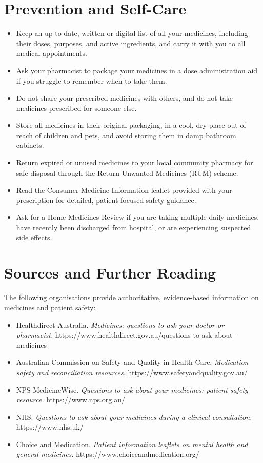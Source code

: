 \section*{Prevention and Self-Care}
\begin{itemize}
    \item Keep an up-to-date, written or digital list of all your medicines, including their doses, purposes, and active ingredients, and carry it with you to all medical appointments.
    \item Ask your pharmacist to package your medicines in a dose administration aid if you struggle to remember when to take them.
    \item Do not share your prescribed medicines with others, and do not take medicines prescribed for someone else.
    \item Store all medicines in their original packaging, in a cool, dry place out of reach of children and pets, and avoid storing them in damp bathroom cabinets.
    \item Return expired or unused medicines to your local community pharmacy for safe disposal through the Return Unwanted Medicines (RUM) scheme.
    \item Read the Consumer Medicine Information leaflet provided with your prescription for detailed, patient-focused safety guidance.
    \item Ask for a Home Medicines Review if you are taking multiple daily medicines, have recently been discharged from hospital, or are experiencing suspected side effects.
\end{itemize}

\section*{Sources and Further Reading}
The following organisations provide authoritative, evidence-based information on medicines and patient safety:
\begin{itemize}
    \item Healthdirect Australia. \textit{Medicines: questions to ask your doctor or pharmacist.} https://www.healthdirect.gov.au/questions-to-ask-about-medicines
    \item Australian Commission on Safety and Quality in Health Care. \textit{Medication safety and reconciliation resources.} https://www.safetyandquality.gov.au/
    \item NPS MedicineWise. \textit{Questions to ask about your medicines: patient safety resource.} https://www.nps.org.au/
    \item NHS. \textit{Questions to ask about your medicines during a clinical consultation.} https://www.nhs.uk/
    \item Choice and Medication. \textit{Patient information leaflets on mental health and general medicines.} https://www.choiceandmedication.org/
\end{itemize}
